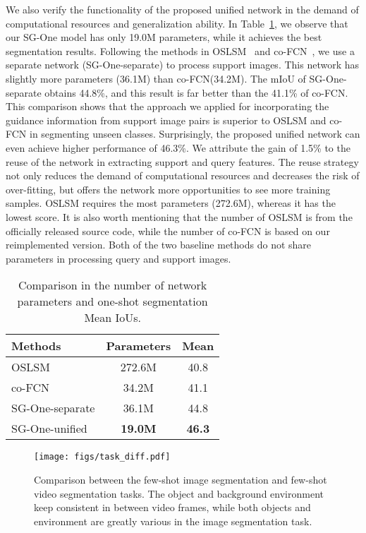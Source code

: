 \documentclass[journal]{IEEEtran}
\begin{document}
We also verify the functionality of the proposed unified network in the demand of computational resources and generalization ability.
In Table~\ref{tab_num_para}, we observe that our SG-One model has only 19.0M parameters, while it achieves the best segmentation results.
Following the methods in OSLSM~\cite{shaban2017one} and co-FCN~\cite{rakelly2018conditional}, we use a separate network (SG-One-separate) to process support images. 
This network has slightly more parameters (36.1M) than co-FCN(34.2M).
The mIoU of SG-One-separate obtains 44.8\%, and this result is far better than the 41.1\% of co-FCN.
This comparison shows that the approach we applied for incorporating the guidance information from support image pairs is superior to OSLSM and co-FCN in segmenting unseen classes.
Surprisingly, the proposed unified network can even achieve higher performance of 46.3\%. 
We attribute the gain of 1.5\% to the reuse of the network in extracting support and query features. 
The reuse strategy not only reduces the demand of computational resources and decreases the risk of over-fitting, but offers the network more opportunities to see more training samples.
OSLSM requires the most parameters (272.6M), whereas it has the lowest score.
It is also worth mentioning that the number of OSLSM is from the officially released source code, while the number of co-FCN is based on our reimplemented version. Both of the two baseline methods do not share parameters in processing query and support images.
\begin{table}\setlength{\tabcolsep}{20pt}
  \centering
  \caption{Comparison in the number of network parameters and one-shot segmentation Mean IoUs.}\label{tab_num_para}
  \begin{tabular}{l|c|c}
    \hline
    \hline
    \textbf{Methods} & \textbf{Parameters} & \textbf{Mean} \\
    \hline
    OSLSM~\cite{shaban2017one} & 272.6M  & 40.8 \\
co-FCN~\cite{rakelly2018conditional} & 34.2M  & 41.1 \\
SG-One-separate &  36.1M &  44.8 \\
SG-One-unified &  \textbf{19.0M} & \textbf{46.3} \\
    \hline
    \hline
  \end{tabular}
  \vspace{-10pt}
\end{table}

\begin{figure}
  \centering
  \texttt{[image: figs/task\_diff.pdf]}
  \caption{Comparison between the few-shot image segmentation and few-shot video segmentation tasks. The object and background environment keep consistent in between video frames, while both objects and environment are greatly various in the image segmentation task.}\label{task_diff}
  \vspace{-10pt}
\end{figure}
\end{document}
